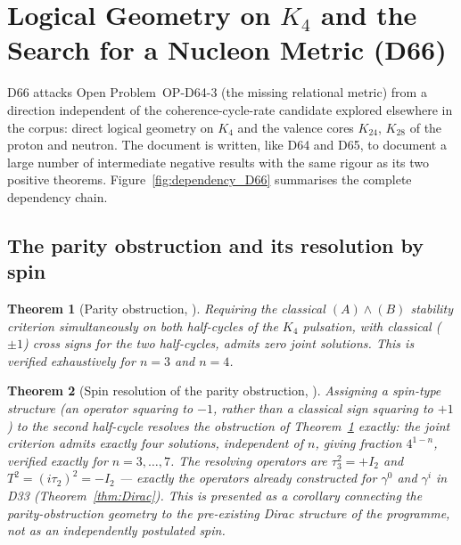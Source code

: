 \documentclass[11pt,a4paper]{article}
\theoremstyle{plain}
\newtheorem{theorem}{Theorem}[section]
\theoremstyle{definition}
\theoremstyle{remark}
\begin{document}
\section{Logical Geometry on \texorpdfstring{$K_4$}{K4} and the Search for a Nucleon Metric (D66)}
\label{sec:D66}

D66 attacks Open Problem~OP-D64-3 (the missing relational metric) from a direction independent of the coherence-cycle-rate candidate explored elsewhere in the corpus: direct logical geometry on $K_4$ and the valence cores $K_{24}$, $K_{28}$ of the proton and neutron. The document is written, like D64 and D65, to document a large number of intermediate negative results with the same rigour as its two positive theorems. Figure~\ref{fig:dependency_D66} summarises the complete dependency chain.

\subsection{The parity obstruction and its resolution by spin}
\label{subsec:parityobstruction}

\begin{theorem}[Parity obstruction, \cite{D66}]
\label{thm:parityobstruction}
Requiring the classical $(A)\wedge(B)$ stability criterion simultaneously on both half-cycles of the $K_4$ pulsation, with classical ($\pm1$) cross signs for the two half-cycles, admits zero joint solutions. This is verified exhaustively for $n=3$ and $n=4$.
\end{theorem}

\begin{theorem}[Spin resolution of the parity obstruction, \cite{D66}]
\label{thm:spinresolution}
Assigning a spin-type structure (an operator squaring to $-1$, rather than a classical sign squaring to $+1$) to the second half-cycle resolves the obstruction of Theorem~\ref{thm:parityobstruction} exactly: the joint criterion admits exactly four solutions, independent of $n$, giving fraction $4^{1-n}$, verified exactly for $n=3,\ldots,7$. The resolving operators are $\tau_3^2=+I_2$ and $T^2=(i\tau_2)^2=-I_2$ --- exactly the operators already constructed for $\gamma^0$ and $\gamma^i$ in D33 (Theorem~\ref{thm:Dirac}). This is presented as a corollary connecting the parity-obstruction geometry to the pre-existing Dirac structure of the programme, not as an independently postulated spin.
\end{theorem}
\end{document}
